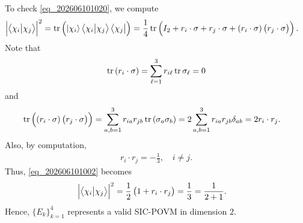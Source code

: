 To check \eqref{eq_202606101020}, we compute
\begin{align}\label{eq_202606101002}
\left|\bra{\chi_{i}}\ket{\chi_j}\right|^2&=\tr\left(\ket{\chi_i}\bra{\chi_i}\ket{\chi_j}\bra{\chi_j}\right)=\frac{1}{4}\tr\left(I_2+r_i\cdot\sigma+r_j\cdot\sigma+\left(r_i\cdot\sigma\right)\left(r_j\cdot\sigma\right)\right).
\end{align}
Note that 
\begin{align*}
\tr\left(r_i\cdot\sigma\right)=\sum_{\ell=1}^3r_{i\ell}\tr\sigma_{\ell}=0
\end{align*}
and
\begin{align*}
\tr\left(\left(r_i\cdot\sigma\right)\left(r_j\cdot\sigma\right)\right)&=\sum_{a,b=1}^3r_{ia}r_{jb}\tr\left(\sigma_a\sigma_b\right)=2\sum_{a,b=1}^3r_{ia}r_{jb}\delta_{ab}=2r_i\cdot r_j.
\end{align*}
Also, by computation,
\begin{align*}
r_i\cdot r_j=-\frac{1}{3},\quad i\neq j.
\end{align*}
Thus, \eqref{eq_202606101002} becomes
\begin{align*}
\left|\bra{\chi_{i}}\ket{\chi_j}\right|^2&=\frac{1}{2}\left(1+r_i\cdot r_j\right)=\frac{1}{3}=\frac{1}{2+1}.
\end{align*}
Hence, $\{E_k\}_{k=1}^4$ represents a valid SIC-POVM in dimension $2$.

